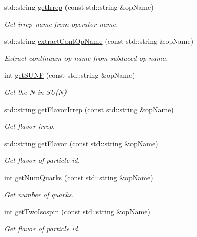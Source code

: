 \begin{DoxyCompactItemize}
std\+::string \mbox{\hyperlink{namespaceHadron_a33d1d1e15a13f881d974049a8ae1c3dc}{get\+Irrep}} (const std\+::string \&op\+Name)
\begin{DoxyCompactList}\small\item\em Get irrep name from operator name. \end{DoxyCompactList}\item 
std\+::string \mbox{\hyperlink{namespaceHadron_a0b8fc65d4da647ad0c70885da63e157e}{extract\+Cont\+Op\+Name}} (const std\+::string \&op\+Name)
\begin{DoxyCompactList}\small\item\em Extract continuum op name from subduced op name. \end{DoxyCompactList}\item 
int \mbox{\hyperlink{namespaceHadron_a61e330de82814218612462c430ceaeb9}{get\+S\+U\+NF}} (const std\+::string \&op\+Name)
\begin{DoxyCompactList}\small\item\em Get the N in S\+U(\+N) \end{DoxyCompactList}\item 
std\+::string \mbox{\hyperlink{namespaceHadron_ad5a318554ed24d3e28841abd57345adf}{get\+Flavor\+Irrep}} (const std\+::string \&op\+Name)
\begin{DoxyCompactList}\small\item\em Get flavor irrep. \end{DoxyCompactList}\item 
std\+::string \mbox{\hyperlink{namespaceHadron_adfbec5b7f783df2c9cefec3692adf179}{get\+Flavor}} (const std\+::string \&op\+Name)
\begin{DoxyCompactList}\small\item\em Get flavor of particle id. \end{DoxyCompactList}\item 
int \mbox{\hyperlink{namespaceHadron_a030f1f2fabdb2b0de5421b2a0a15689c}{get\+Num\+Quarks}} (const std\+::string \&op\+Name)
\begin{DoxyCompactList}\small\item\em Get number of quarks. \end{DoxyCompactList}\item 
int \mbox{\hyperlink{namespaceHadron_a28f936e0038f56334a16574038c9aa0b}{get\+Two\+Isospin}} (const std\+::string \&op\+Name)
\begin{DoxyCompactList}\small\item\em Get flavor of particle id. \end{DoxyCompactList}\item 

\end{DoxyCompactItemize}

